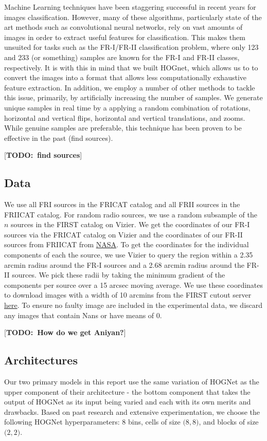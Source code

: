 \documentclass{article}
\newcommand{\todo}[1]{ {\color{red}[{\bf TODO:~{#1}}]}}
\begin{document}
Machine Learning techniques have been staggering successful in recent years for images classification. However, many of these algorithms, particularly state of the art methods such as convolutional neural networks, rely on vast amounts of images in order to extract useful features for classification. This makes them unsuited for tasks such as the FR-I/FR-II classification problem, where only 123 and 233 (or something) samples are known for the FR-I and FR-II classes, respectively. It is with this in mind that we built HOGnet, which allows us to to convert the images into a format that allows less computationally exhaustive feature extraction. In addition, we employ a number of other methods to tackle this issue, primarily, by artificially increasing the number of samples. We generate unique samples in real time by a applying a random combination of rotations, horizontal and vertical flips, horizontal and vertical translations, and zooms.  While genuine samples are preferable, this technique has been proven to be effective in the past (find sources).  

\todo{find sources}

\subsection{\label{sec:level2}Data}
We use all FRI sources in the FRICAT catalog and all FRII sources in the FRIICAT catalog. For random radio sources, we use a random subsample of the \(n\) sources in the FIRST catalog on Vizier. We get the coordinates of our FR-I sources via the FRICAT catalog on Vizier and the coordinates of our FR-II sources from FRIICAT from \href{http://go.nasa.gov/2jlAMfN}{NASA}. To get the coordinates for the individual components of each the source, we use Vizier to query the region within a 2.35 arcmin radius around the FR-I sources and a 2.68 arcmin radius around the FR-II sources. We pick these radii by taking the minimum gradient of the components per source over a 15 arcsec moving average. We use these coordinates to download images with a width of 10 arcmins from the FIRST cutout server \href{https://third.ucllnl.org/cgi-bin/firstcutout}{here}. To ensure no faulty image are included in the experimental data, we discard any images that contain Nans or have means of 0.

\todo{How do we get Aniyan?}

\subsection{\label{sec:level2}Architectures}
Our two primary models in this report use the same variation of HOGNet as the upper component of their architecture - the bottom component that takes the output of HOGNet as its input being varied and each with its own merits and drawbacks. Based on past research and extensive experimentation, we choose the following HOGNet hyperparameters: 8 bins, cells of size \( \big(8,  8 \big)\), and blocks of size \( \big(2,  2 \big)\). 
\end{document}
